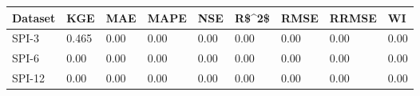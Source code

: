 \begin{tabular}{lllllllll}
\toprule
Dataset &   KGE &  MAE & MAPE &  NSE & R\$\textasciicircum 2\$ & RMSE & RRMSE &   WI \\
\midrule
  SPI-3 & 0.465 & 0.00 & 0.00 & 0.00 &  0.00 & 0.00 &  0.00 & 0.00 \\
  SPI-6 &  0.00 & 0.00 & 0.00 & 0.00 &  0.00 & 0.00 &  0.00 & 0.00 \\
 SPI-12 &  0.00 & 0.00 & 0.00 & 0.00 &  0.00 & 0.00 &  0.00 & 0.00 \\
\bottomrule
\end{tabular}
